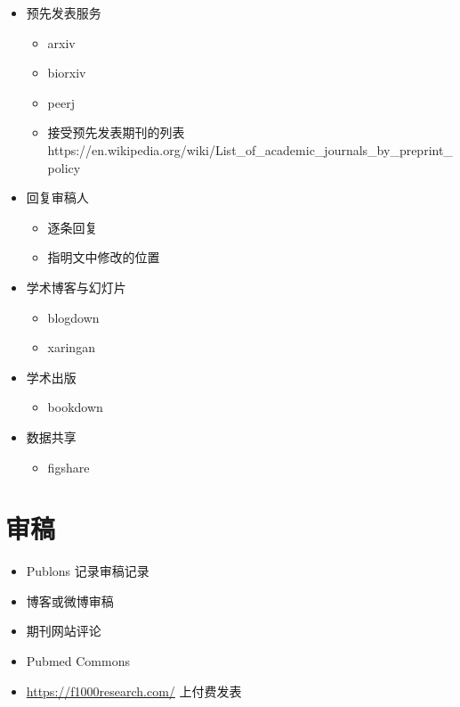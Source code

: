\documentclass[]{book}
\providecommand{\tightlist}{%
  \setlength{\itemsep}{0pt}\setlength{\parskip}{0pt}}
\begin{document}
\begin{itemize}
\tightlist
\item
  预先发表服务

  \begin{itemize}
  \tightlist
  \item
    arxiv
  \item
    biorxiv
  \item
    peerj
  \item
    接受预先发表期刊的列表https://en.wikipedia.org/wiki/List\_of\_academic\_journals\_by\_preprint\_policy
  \end{itemize}
\item
  回复审稿人

  \begin{itemize}
  \tightlist
  \item
    逐条回复
  \item
    指明文中修改的位置
  \end{itemize}
\item
  学术博客与幻灯片

  \begin{itemize}
  \tightlist
  \item
    blogdown
  \item
    xaringan
  \end{itemize}
\item
  学术出版

  \begin{itemize}
  \tightlist
  \item
    bookdown
  \end{itemize}
\item
  数据共享

  \begin{itemize}
  \tightlist
  \item
    figshare
  \end{itemize}
\end{itemize}

\section{审稿}\label{-1}

\begin{itemize}
\tightlist
\item
  Publons 记录审稿记录
\item
  博客或微博审稿
\item
  期刊网站评论
\item
  Pubmed Commons
\item
  \url{https://f1000research.com/} 上付费发表
\end{itemize}
\end{document}
